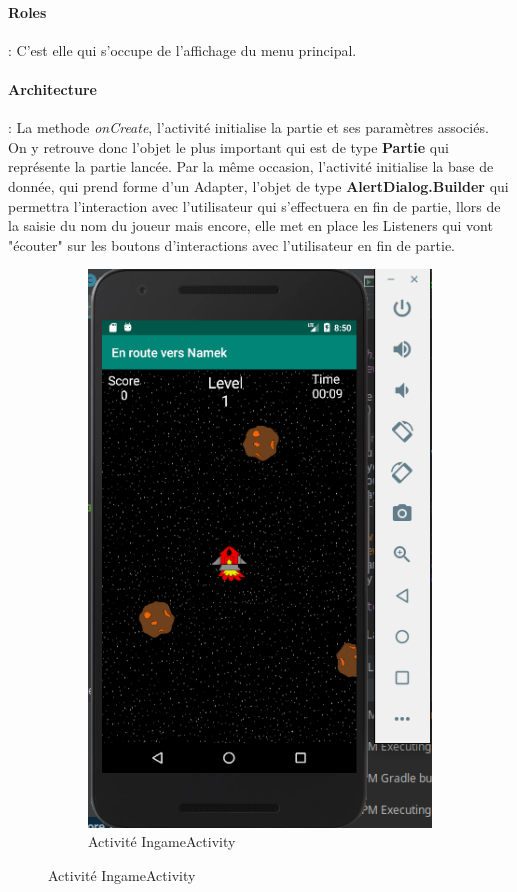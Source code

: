 \documentclass{article}
\begin{document}
\paragraph{Roles}: C'est elle qui s'occupe de l'affichage du menu principal.
\paragraph{Architecture}: La methode \textit{onCreate}, l'activité initialise la partie et ses paramètres associés. On y retrouve donc l'objet le plus important qui est de type \textbf{Partie} qui représente la partie lancée. Par la même occasion, l'activité initialise la base de donnée, qui prend forme d'un Adapter, l'objet de type \textbf{AlertDialog.Builder} qui permettra l'interaction avec l'utilisateur qui s'effectuera en fin de partie, llors de la saisie du nom du joueur mais encore, elle met en place les Listeners qui vont "écouter" sur les boutons d'interactions avec l'utilisateur en fin de partie.

\begin{figure}
\centering
 \begin{subfigure}[b]{0.4\textwidth}
  \includegraphics[width=\textwidth]{images/ingameView.png}
  \caption{Activité IngameActivity}
 \end{subfigure}
\end{figure}
\end{document}
